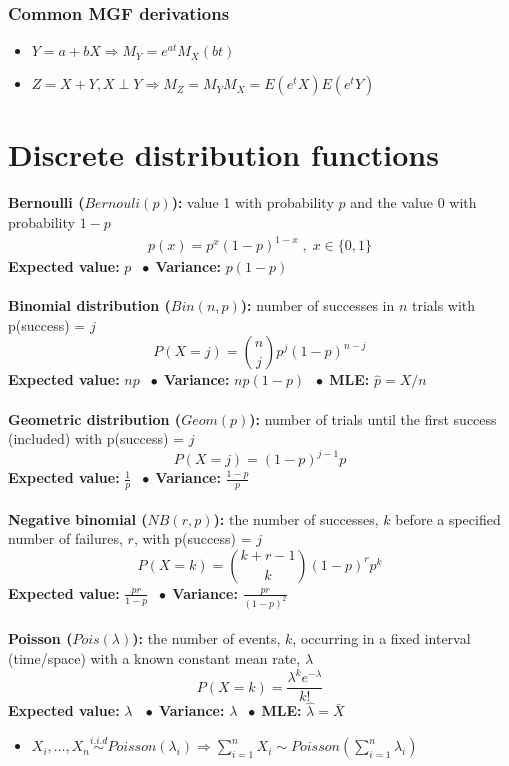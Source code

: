 \documentclass{article}
\newcommand{\bspace}{$\;\bullet\;$}
\begin{document}
\subsubsection{Common MGF derivations}
\begin{itemize}
    \item $Y = a+bX \Longrightarrow M_Y = e^{at}M_X(bt)$
    \item $Z = X+Y, X \perp Y \Longrightarrow M_Z = M_YM_X = E(e^tX)E(e^tY)$
\end{itemize}


\section{Discrete distribution functions}
\textbf{Bernoulli ($Bernouli(p)$):} value 1 with probability $p$ and the value 0 with probability $1-p$
\begin{align*}
    p(x) = p^x(1-p)^{1-x} \;,\; x \in \{0, 1\}
\end{align*}
\textbf{Expected value:} $p$ \bspace \textbf{Variance:} $p(1-p)$\\\\
\textbf{Binomial distribution ($Bin(n,p)$):} number of successes in $n$ trials with p(success) = $j$
\begin{equation*}
    P(X = j) = {n \choose j} p^j (1 - p)^{n-j}
\end{equation*}
\textbf{Expected value:} $np$ \bspace \textbf{Variance:} $np(1-p)$ \bspace \textbf{MLE:} $\hat{p} = X/n$\\\\
\textbf{Geometric distribution ($Geom(p)$):} number of trials until the first success (included) with p(success) = $j$
\begin{equation*}
    P(X=j) = (1-p)^{j-1}p
\end{equation*}
\textbf{Expected value:} $\frac{1}{p}$ \bspace \textbf{Variance:} $\frac{1-p}{p}$\\\\
\textbf{Negative binomial ($NB(r, p)$):} the number of successes, $k$ before a specified number of failures, $r$, with p(success) = $j$
\begin{equation*}
	P(X = k) = {k + r - 1 \choose k} (1-p)^rp^k
\end{equation*}
\textbf{Expected value:} $\frac{pr}{1-p}$ \bspace \textbf{Variance:} $\frac{pr}{(1 - p)^2}$\\\\
\textbf{Poisson ($Pois(\lambda)$):} the number of events, $k$, occurring in a fixed interval (time/space) with a known constant mean rate, $\lambda$
\begin{equation*}
	P(X = k) = \frac{\lambda^ke^{-\lambda}}{k!}
\end{equation*}
\textbf{Expected value:} $\lambda$\ \bspace \textbf{Variance:} $\lambda$ \bspace \textbf{MLE:} $\hat{\lambda} = \bar{X}$
\begin{itemize}
    \item $X_i, \dots, X_n \overset{i.i.d}{\sim} Poisson(\lambda_i) \Longrightarrow \sum_{i=1}^nX_i \sim Poisson\left(\sum_{i=1}^n \lambda_i \right)$
\end{itemize}
\end{document}
